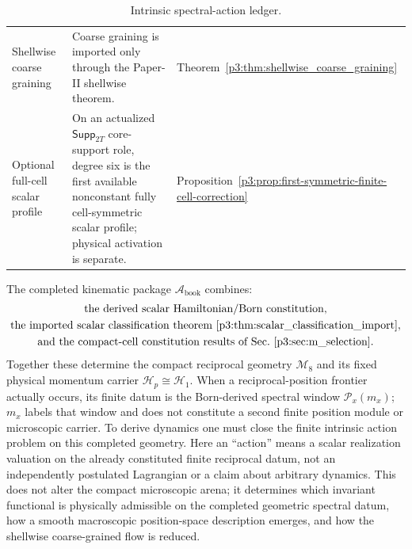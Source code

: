 \documentclass[12pt,a4paper]{article}
\begin{document}
\begin{table}[H]
\begin{tabular}{@{}
  L{3.0cm}
  L{9cm}
  L{\dimexpr\linewidth-12cm-4\tabcolsep\relax}
@{}}
Shellwise coarse graining
& Coarse graining is imported only through the Paper-II shellwise theorem.
& Theorem~\ref{p3:thm:shellwise_coarse_graining} \\

Optional full-cell scalar profile
& On an actualized \(\mathsf{Supp}_{2T}\) core-support role, degree six is the first available nonconstant fully cell-symmetric scalar profile; physical activation is separate.
& Proposition~\ref{p3:prop:first-symmetric-finite-cell-correction} \\
\bottomrule
\end{tabular}
\caption[Intrinsic spectral-action ledger]{Intrinsic spectral-action ledger.}
\label{tab:p3-dcl-ledger}
\endgroup
\end{table}


The completed kinematic package \(\mathcal A_{\mathrm{book}}\) combines:
\[
\begin{gathered}
\text{the derived scalar Hamiltonian/Born constitution,}\\
\text{the imported scalar classification theorem }
\ref{p3:thm:scalar_classification_import},\\
\text{and the compact-cell constitution results of }
\text{Sec.~\ref{p3:sec:m_selection}}.
\end{gathered}
\]
Together these determine the compact reciprocal geometry \(\mathcal M_8\)
and its fixed physical momentum carrier \(\mathcal H_p\cong\mathcal H_1\).
When a reciprocal-position frontier actually occurs, its finite datum is the
Born-derived spectral window \(\mathcal P_x(m_x)\); \(m_x\) labels that
window and does not constitute a second finite position module or microscopic
carrier.
To derive dynamics one must close the finite intrinsic action problem on this
completed geometry.  Here an ``action'' means a scalar realization valuation on
the already constituted finite reciprocal datum, not an independently postulated
Lagrangian or a claim about arbitrary dynamics.  This does not alter the compact
microscopic arena; it determines which invariant functional is physically
admissible on the completed geometric spectral datum, how a smooth macroscopic
position-space description emerges, and how the shellwise coarse-grained flow is
reduced.
\end{document}
